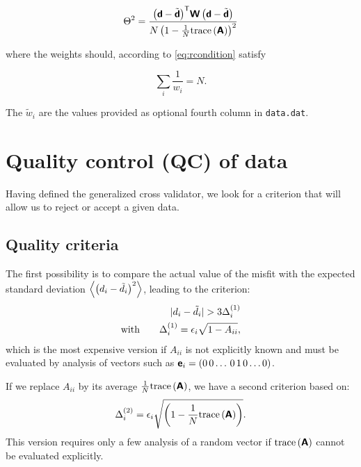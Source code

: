 \begin{equation}
\Theta^2=\frac{ {\left(\mbox{\boldmath $ \protect\mathsf{d} $}-\tilde{\mbox{\boldmath $ \protect\mathsf{d} $}}\right)}^\mathsf{T} \mbox{\boldmath $ \protect\mathsf{W} $} \left(\mbox{\boldmath $ \protect\mathsf{d} $}-\tilde{\mbox{\boldmath $ \protect\mathsf{d} $}}\right) }{ N \left(1 - \frac{1}{N}\mathrm{trace}\left( \mbox{\boldmath $ \protect\mathsf{A} $} \right)\right)^2} 
\label{eq:gcvbis}
\end{equation}

where the weights should, according to \eqref{eq:rcondition} satisfy

\begin{equation}
\sum_i \frac{1 }{w_i} = N.
\label{eq:condition}
\end{equation}

The $\tilde{w}_i$ are the values provided as optional fourth column in \texttt{data.dat}.

\section{Quality control (QC) of data\label{secdivaqc}}

Having defined the generalized cross validator, we look for a criterion that will allow us to reject or accept a given data.

\subsection{Quality criteria}

The first possibility is to compare the actual value of the misfit with the expected standard deviation $\left\langle \left(d_i - \tilde{d}_i\right)^2 \right\rangle$, leading to the criterion:
\begin{eqnarray}
| d_i - \tilde{d}_i | > 3 \Delta_i^{(1)}\\
\textrm{with}  \qquad \Delta_i^{(1)} = \epsilon_i \sqrt{1-A_{ii}},\label{eq:qc1}
\end{eqnarray}
which is the most expensive version if $A_{ii}$ is not explicitly known and must be evaluated by analysis of vectors such as $\mbox{\boldmath $ \protect\mathsf{e} $}_i=(0\,0\ldots\,0\,1\,0\ldots 0)$. 

If we replace $A_{ii}$ by its average $\frac{1}{N}\mathrm{trace}\left( \mbox{\boldmath $ \protect\mathsf{A} $} \right)$, we have a second criterion based on:
\begin{equation}
\Delta_i^{(2)} = \epsilon_i \sqrt{ \left({1-\frac{1}{N} \mathrm{trace}\left( \mbox{\boldmath $ \protect\mathsf{\mbox{\boldmath $ \protect\mathsf{A} $}} $} \right)}\right)}. 
\label{eq:qc2}
\end{equation}
This version requires only a few analysis of a random vector if $\mathrm{trace}\left( \mbox{\boldmath $ \protect\mathsf{A} $} \right)$ cannot be evaluated explicitly.


